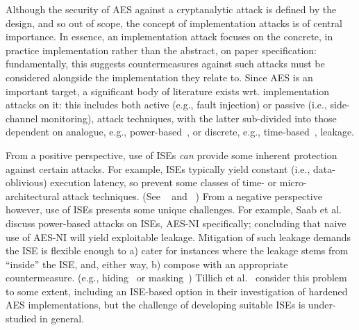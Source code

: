 
Although the security of AES against a cryptanalytic attack is defined by
the design, and so out of scope, the concept of implementation attacks is
of central importance.
In essence, an implementation attack focuses on
the concrete, in practice implementation
rather than
the abstract, on paper     specification:
fundamentally, this suggests countermeasures against such attacks must be
considered alongside the implementation they relate to.
Since AES is an important target, a significant body of literature exists
wrt. implementation attacks on it: this includes both
 active (e.g., fault injection)
or
passive (i.e., side-channel monitoring),
attack techniques,
with the latter sub-divided into those dependent on
analogue,
e.g., power-based~\cite{ManOswPop:07},
or
discrete, 
e.g.,  time-based~\cite{KoeQui:99},
leakage.

From a positive perspective, use of ISEs
{\em can} provide some inherent protection against certain attacks.
For example,
ISEs typically yield constant (i.e., data-oblivious) execution latency,
so prevent some classes of time- or micro-architectural
attack techniques.
(See ~\cite[Section 4]{Szefer:19} and ~\cite[Section 4]{GYCH:18})
From a negative perspective however,
use of ISEs presents some unique challenges.
For example, 
Saab et al.\cite{SaaRohHam:16}
discuss power-based attacks on ISEs, AES-NI specifically; concluding
that naive use of AES-NI will yield exploitable leakage.  Mitigation of
such leakage demands the ISE is flexible enough to 
a) cater for instances where the leakage stems from ``inside'' the ISE,
   and, either way,
b) compose with an appropriate
   countermeasure.
   (e.g., hiding~\cite[Chapter 7]{ManOswPop:07} or masking~\cite[Chapter 10]{ManOswPop:07})
Tillich et al.~\cite{TilHerMan:07}
consider this problem to some extent, including an ISE-based option in
their investigation of hardened AES implementations, but the challenge
of developing suitable ISEs is under-studied in general.

